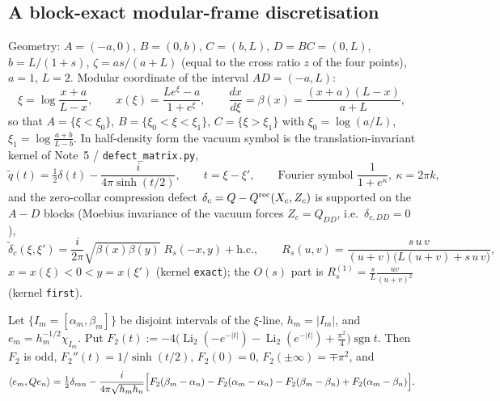 \documentclass[11pt]{article}
\DeclareMathOperator{\Li}{Li}
\DeclareMathOperator{\sgn}{sgn}
\begin{document}
\subsection{A block-exact modular-frame discretisation}
\label{sec:disc}
Geometry: $A=(-a,0)$, $B=(0,b)$, $C=(b,L)$, $D=BC=(0,L)$, $b=L/(1+s)$,
$\zeta=as/(a+L)$ (equal to the cross ratio $z$ of the four points), $a=1$, $L=2$.
Modular coordinate of the interval $AD=(-a,L)$:
\begin{equation}\label{eq:xi}
 \xi=\log\frac{x+a}{L-x},\qquad x(\xi)=\frac{Le^\xi-a}{1+e^\xi},\qquad
 \frac{dx}{d\xi}=\beta(x)=\frac{(x+a)(L-x)}{a+L},
\end{equation}
so that $A=\{\xi<\xi_0\}$, $B=\{\xi_0<\xi<\xi_1\}$, $C=\{\xi>\xi_1\}$ with
$\xi_0=\log(a/L)$, $\xi_1=\log\frac{a+b}{L-b}$.  In half-density form the vacuum symbol is the
translation-invariant kernel of Note~5 / \texttt{defect\_matrix.py},
\begin{equation}\label{eq:qt}
 \widetilde q(t)=\tfrac12\delta(t)-\frac{i}{4\pi\sinh(t/2)},\qquad t=\xi-\xi',
 \qquad\text{Fourier symbol } \frac{1}{1+e^{\kappa}},\ \kappa=2\pi k ,
\end{equation}
and the zero-collar compression defect $\delta_c=Q-Q^{\rm rec}(X_c,Z_c)$ is supported on the
$A\!-\!D$ blocks (Moebius invariance of the vacuum forces $Z_c=Q_{DD}$, i.e.\ $\delta_{c,DD}=0$),
\begin{equation}\label{eq:dc}
 \widetilde\delta_c(\xi,\xi')=\frac{i}{2\pi}\sqrt{\beta(x)\beta(y)}\;R_s(-x,y)+\text{h.c.},\qquad
 R_s(u,v)=\frac{s\,u\,v}{(u+v)\bigl(L(u+v)+s\,u\,v\bigr)},
\end{equation}
$x=x(\xi)<0<y=x(\xi')$ (kernel \texttt{exact}); the $O(s)$ part is $R_s^{(1)}=\frac{s}{L}\frac{uv}{(u+v)^2}$
(kernel \texttt{first}).

\begin{lemma}\label{lem:closed}
Let $\{I_m=[\alpha_m,\beta_m]\}$ be disjoint intervals of the $\xi$-line, $h_m=|I_m|$, and
$e_m=h_m^{-1/2}\chi_{I_m}$.  Put
\(
 F_2(t):=-4\bigl(\Li_2(-e^{-|t|})-\Li_2(e^{-|t|})+\tfrac{\pi^2}{4}\bigr)\sgn t .
\)
Then $F_2$ is odd, $F_2''(t)=1/\sinh(t/2)$, $F_2(0)=0$, $F_2(\pm\infty)=\mp\pi^2$, and
\begin{equation}\label{eq:Qcell}
 \langle e_m,Qe_n\rangle=\tfrac12\delta_{mn}
 -\frac{i}{4\pi\sqrt{h_mh_n}}\Bigl[F_2(\beta_m-\alpha_n)-F_2(\alpha_m-\alpha_n)
 -F_2(\beta_m-\beta_n)+F_2(\alpha_m-\beta_n)\Bigr].
\end{equation}
\end{lemma}
\end{document}
